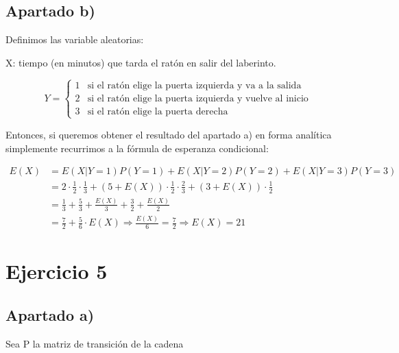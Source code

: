 \documentclass[11pt]{article}
\begin{document}
\subsection*{Apartado b)}

Definimos las variable aleatorias: \\
\begin{center}
  X: tiempo (en minutos) que tarda el ratón en salir del laberinto.
\end{center}

\[
  Y = \begin{cases}
        1 & \text{si el ratón elige la puerta izquierda y va a la salida} \\
        2 & \text{si el ratón elige la puerta izquierda y vuelve al inicio} \\
        3 & \text{si el ratón elige la puerta derecha}
      \end{cases}
\]

Entonces, si queremos obtener el resultado del apartado a) en forma analítica simplemente recurrimos
a la fórmula de esperanza condicional:

\begin{align*}
  E(X) &= E(X \vert Y = 1)P(Y = 1) + E(X \vert Y = 2)P(Y = 2) + E(X \vert Y = 3)P(Y = 3) \\
       &= 2 \cdot \frac{1}{2} \cdot \frac{1}{3} + 
          (5 + E(X)) \cdot \frac{1}{2} \cdot \frac{2}{3} +
          (3 + E(X)) \cdot \frac{1}{2} \\
      &= \frac{1}{3} + \frac{5}{3} + \frac{E(X)}{3} + \frac{3}{2} + \frac{E(X)}{2} \\
      &= \frac{7}{2} + \frac{5}{6} \cdot E(X) \Rightarrow \frac{E(X)}{6} = \frac{7}{2} \Rightarrow E(X) = 21
\end{align*}


\section{Ejercicio 5}

\subsection*{Apartado a)}

Sea P la matriz de transición de la cadena
\end{document}
